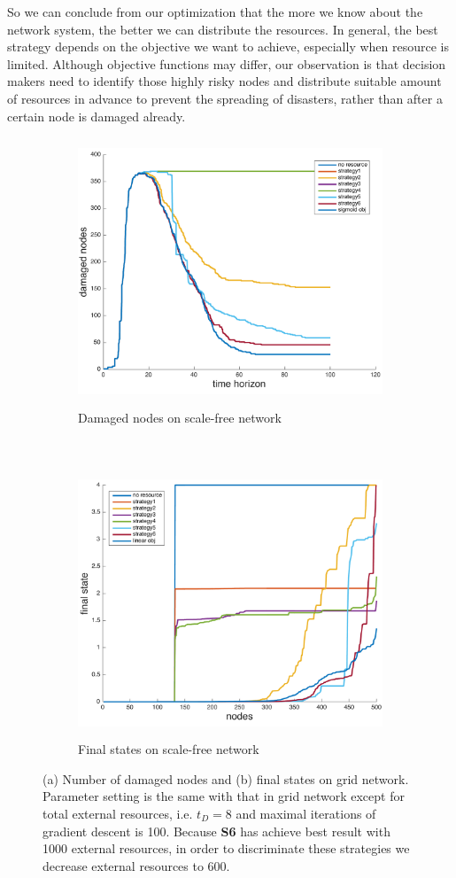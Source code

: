So we can conclude from our optimization that the more we know about the network system, the better we can distribute the resources. In general, the best strategy depends on the objective we want to achieve, especially when resource is limited. Although objective functions may differ, our observation is that decision makers need to identify those highly risky nodes and distribute suitable amount of resources in advance to prevent the spreading of disasters, rather than after a certain node is damaged already.  


\begin{figure}	
	\centering
	\begin{subfigure}[t]{0.8\textwidth}
		\centering
		\includegraphics[height=80mm]{../figs/no_linear_approximation/SF_damaged_small.pdf}
		\caption{Damaged nodes on scale-free network}
	\end{subfigure}
	~
	\begin{subfigure}[t]{0.8\textwidth}
		\centering
		\includegraphics[height=80mm]{../figs/no_linear_approximation/SF_finalState_small.pdf}
		\caption{Final states on scale-free network}
	\end{subfigure}
	\caption{(a) Number of damaged nodes and (b) final states on grid network. Parameter setting is the same with that in grid network except for total external resources, i.e. $t_D=8$ and maximal iterations of gradient descent is 100. Because \textbf{S6} has achieve best result with 1000 external resources, in order to discriminate these strategies we decrease external resources to 600.}
	\label{fig:opt_on_sf}
\end{figure}





